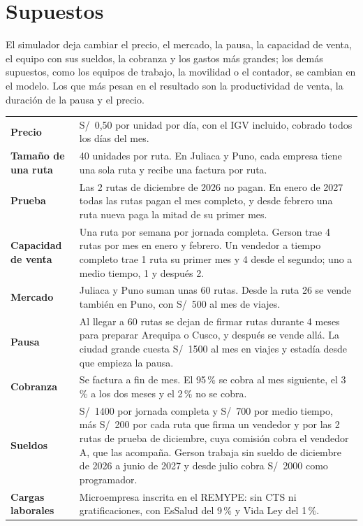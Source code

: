 \documentclass[10.5pt,a4paper]{article}
\begin{document}
\section{Supuestos}

El simulador deja cambiar el precio, el mercado, la pausa, la capacidad de venta, el equipo con sus sueldos, la cobranza y los gastos más grandes; los demás supuestos, como los equipos de trabajo, la movilidad o el contador, se cambian en el modelo. Los que más pesan en el resultado son la productividad de venta, la duración de la pausa y el precio.

{\small
\begin{tabularx}{\linewidth}{@{}>{\bfseries}p{3.3cm}X@{}}
\toprule
Precio & S/~0,50 por unidad por día, con el IGV incluido, cobrado todos los días del mes.\\
Tamaño de una ruta & 40 unidades por ruta. En Juliaca y Puno, cada empresa tiene una sola ruta y recibe una factura por ruta.\\
Prueba & Las 2 rutas de diciembre de 2026 no pagan. En enero de 2027 todas las rutas pagan el mes completo, y desde febrero una ruta nueva paga la mitad de su primer mes.\\
Capacidad de venta & Una ruta por semana por jornada completa. Gerson trae 4 rutas por mes en enero y febrero. Un vendedor a tiempo completo trae 1 ruta su primer mes y 4 desde el segundo; uno a medio tiempo, 1 y después 2.\\
Mercado & Juliaca y Puno suman unas 60 rutas. Desde la ruta 26 se vende también en Puno, con S/~500 al mes de viajes.\\
Pausa & Al llegar a 60 rutas se dejan de firmar rutas durante 4 meses para preparar Arequipa o Cusco, y después se vende allá. La ciudad grande cuesta S/~1500 al mes en viajes y estadía desde que empieza la pausa.\\
Cobranza & Se factura a fin de mes. El 95\,\% se cobra al mes siguiente, el 3\,\% a los dos meses y el 2\,\% no se cobra.\\
Sueldos & S/~1400 por jornada completa y S/~700 por medio tiempo, más S/~200 por cada ruta que firma un vendedor y por las 2 rutas de prueba de diciembre, cuya comisión cobra el vendedor A, que las acompaña. Gerson trabaja sin sueldo de diciembre de 2026 a junio de 2027 y desde julio cobra S/~2000 como programador.\\
Cargas laborales & Microempresa inscrita en el REMYPE: sin CTS ni gratificaciones, con EsSalud del 9\,\% y Vida Ley del 1\,\%.\\

\end{tabularx}}
\end{document}
